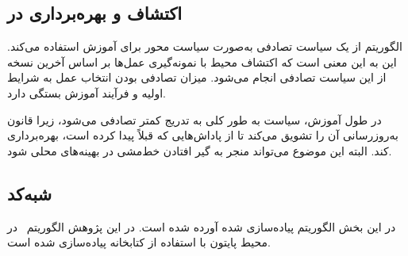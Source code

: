    
        \subsection{اکتشاف و بهره‌برداری در 
   }
الگوریتم  از یک سیاست تصادفی به‌صورت سیاست محور برای آموزش استفاده می‌کند. این به این معنی است که اکتشاف محیط با نمونه‌گیری عمل‌ها بر اساس آخرین نسخه از این سیاست تصادفی انجام می‌شود. میزان تصادفی بودن انتخاب عمل به شرایط اولیه و فرآیند آموزش بستگی دارد.

در طول آموزش، سیاست به طور کلی به تدریج کمتر تصادفی می‌شود، زیرا قانون به‌روزرسانی آن را تشویق می‌کند تا از پاداش‌هایی که قبلاً پیدا کرده است، بهره‌برداری کند. البته این موضوع می‌تواند منجر به گیر افتادن خط‌مشی در بهینه‌های محلی
 شود.
 
 
         \subsection{شبه‌کد
         }
 
 در این بخش الگوریتم
 پیاده‌سازی شده آورده شده است. در این پژوهش الگوریتم~ در محیط پایتون با استفاده از کتابخانه
   \cite{paszke2017automatic}
  پیاده‌سازی شده ‌است.
 



